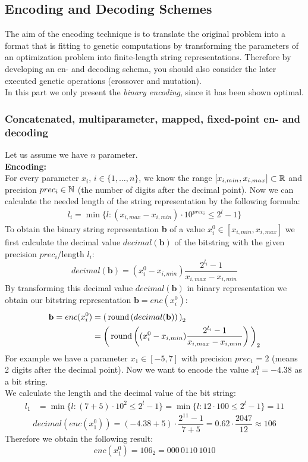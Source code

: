 \subsection{Encoding and Decoding Schemes}
The aim of the encoding technique is to translate the original problem into a format that is fitting to genetic computations by transforming the parameters of an optimization problem into finite-length string representations. Therefore by developing an en- and decoding schema, you should also consider the later executed genetic operations (crossover and mutation).\\
In this part we only present the \emph{binary encoding}, since it has been shown optimal. 


\subsubsection*{Concatenated, multiparameter, mapped, fixed-point en- and decoding} \label{sec:binaryEnc}
Let us assume we have $n$ parameter.\\

\textbf{Encoding:}\\
For every parameter $x_i,\,i\in\{1,\ldots,n\}$, we know the range $[x_{i,min},x_{i,max}]\subset\mathbb{R}$ and precision $prec_i\in\mathbb{N}$ (the number of digits after the decimal point). Now we can calculate the needed length of the string representation by the following formula:
\begin{align} \label{eq:Strlength}
 l_i = \min\{l: (x_{i,max}-x_{i,min})\cdot 10^{prec_i} \leq 2^l-1\}
\end{align}
To obtain the binary string representation \textbf{b} of a value $x_i^0 \in [x_{i,min},x_{i,max}]$ we first calculate the decimal value $decimal(\textbf{b})$ of the bitstring with the given precision $prec_i$/length $l_i$:
\[ decimal(\textbf{b})=(x_i^0 - x_{i,min}) \frac{2^{l_i}-1}{x_{i,max}-x_{i,min}} \]
By transforming this decimal value $decimal(\textbf{b})$ in binary representation we obtain our bitstring representation $\textbf{b}=enc(x_i^0)$:
\begin{align*}
\textbf{b} = enc(x_i^0) &= \left(\, \operatorname{round}\left( decimal(\textbf{b}) \right)\, \right)_2 \\
 &= \left(\, \operatorname{round}\left( (x_i^0 - x_{i,min}) \frac{2^{l_i}-1}{x_{i,max}-x_{i,min}} \right)\, \right)_2
\end{align*}
For example we have a parameter $x_1\in[-5,7]$ with precision $prec_1=2$ (means 2 digits after the decimal point). Now we want to encode the value $x_1^0=-4.38$ as a bit string.\\
We calculate the length and the decimal value of the bit string:
\begin{align*}
l_1 &= \min\{l: (7+5)\cdot 10^2 \leq 2^l-1\} = \min\{l: 12\cdot 100 \leq 2^l-1\} = 11
\end{align*}
\[ decimal(enc(x_1^0)) = (-4.38 + 5)\cdot\frac{2^{11}-1}{7+5} = 0.62\cdot\frac{2047}{12} \approx 106 \]
Therefore we obtain the following result:
\[ enc(x_1^0) = 106_2 = 000\,0110\,1010 \]

